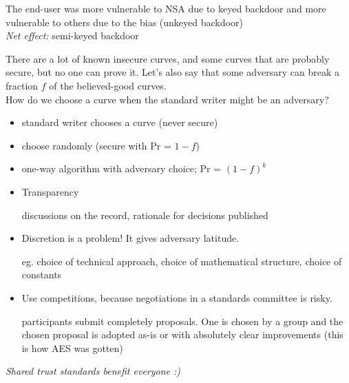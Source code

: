 The end-user was more vulnerable to NSA due to keyed backdoor and more vulnerable to others due to the bias (unkeyed backdoor)\\
\textit{Net effect:} semi-keyed backdoor

There are a lot of known insecure curves, and some curves that are probably secure, but no one can prove it. Let's also say that some adversary can break a fraction $f$ of the believed-good curves.\\

How do we choose a curve when the standard writer might be an adversary?
\begin{itemize}
	\item standard writer chooses a curve (never secure)
	\item choose randomly (secure with Pr = $1-f$)
	\item one-way algorithm with adversary choice; Pr = $(1-f)^k$
\end{itemize}

\begin{itemize}
	\item Transparency

		discussions on the record, rationale for decisions published
	\item Discretion is a problem! It gives adversary latitude.

		eg. choice of technical approach, choice of mathematical structure, choice of constants
	\item Use competitions, because negotiations in a standards committee is risky.

		participants submit completely proposals. One is chosen by a group and the chosen proposal is adopted as-is or with absolutely clear improvements (this is how AES was gotten)
\end{itemize}

\textit{Shared trust standards benefit everyone :)}
